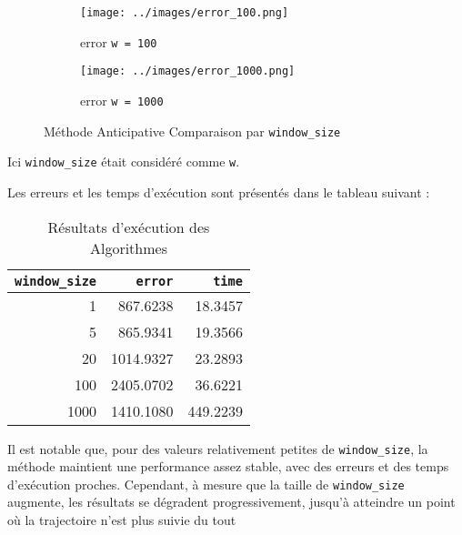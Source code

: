 \documentclass[../CSC_5RO16_TA_TP4.tex]{subfiles}
\begin{document}
\begin{figure}[H]
	\begin{subfigure}[b]{0.19\textwidth}
        \centering
        \texttt{[image: ../images/error\_100.png]}
        \caption{error \texttt{w = 100}}
        \label{fig:methode_anticipative_error_100}
    \end{subfigure}\hfill
	\begin{subfigure}[b]{0.19\textwidth}
        \centering
        \texttt{[image: ../images/error\_1000.png]}
        \caption{error \texttt{w = 1000}}
        \label{fig:methode_anticipative_error_1000}
    \end{subfigure}
    \caption{Méthode Anticipative Comparaison par \texttt{window\_size}}
    \label{fig:methode_anticipative}
\end{figure}
\begin{remark}
    Ici \texttt{window\_size} était considéré comme \texttt{w}.
\end{remark}
\noindent Les erreurs et les temps d'exécution sont présentés dans le tableau suivant :

\begin{table}[H]
    \centering
    \begin{tabular}{rrr}
        \texttt{window\_size} & \texttt{error} & \texttt{time}\\
        \hline\hline
        1 & 867.6238 & 18.3457\\
        5 & 865.9341 & 19.3566\\
        20 & 1014.9327 & 23.2893\\
        100 & 2405.0702 & 36.6221\\
        1000 & 1410.1080 & 449.2239\\
        \hline
    \end{tabular}
    \caption{Résultats d'exécution des Algorithmes}
    \label{tab:methode_anticipative}
\end{table}

\noindent  Il est notable que, pour des valeurs relativement petites de \texttt{window\_size}, la méthode maintient une performance assez stable, avec des erreurs et des temps d'exécution proches. Cependant, à mesure que la taille de \texttt{window\_size} augmente, les résultats se dégradent progressivement, jusqu'à atteindre un point où la trajectoire n'est plus suivie du tout
\end{document}

